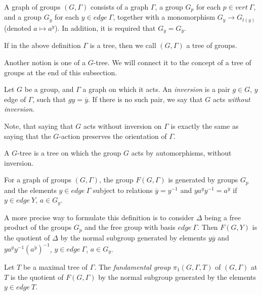 \begin{definition}\label{grpgraph}
    A graph of groups $(G,\Gamma)$ consists of a graph $\Gamma$, a group $G_p$ for each $p \in vert\:\Gamma$, and a group $G_y$ for each $y \in edge \: \Gamma$, together with a monomorphism $G_y \to G_{t(y)}$ (denoted $a \mapsto a^y$). In addition, it is required that $G_y = G_{\overline{y}}$.
\end{definition}

If in the above definition $\Gamma$ is a tree, then we call $(G,\Gamma)$ a tree of groups.

Another notion is one of a $G$-tree. We will connect it to the concept of a tree of groups at the end of this subsection.

\begin{definition}
    Let $G$ be a group, and $\Gamma$ a graph on which it acts. An \emph{inversion} is a pair $g \in G$, $y$ edge of $\Gamma$, such that $gy = \overline{y}$. If there is no such pair, we say that $G$ acts \emph{without inversion}. 
\end{definition}

Note, that saying that $G$ acts without inversion on $\Gamma$ is exactly the same as saying that the $G$-action preserves the orientation of $\Gamma$.

\begin{definition}
    A $G$-tree is a tree on which the group $G$ acts by automorphisms, without inversion.
\end{definition}

\begin{definition}
    For a graph of groups $(G,\Gamma)$, the group $F(G,\Gamma)$ is generated by groups $G_p$ and the elements $y \in edge \: \Gamma$ subject to relations $\overline{y} = y^{-1}$ and $ya^yy^{-1} = a^{\overline{y}}$ if $y \in edge \: Y$, $a \in G_y$.
\end{definition}

A more precise way to formulate this definition is to consider $\Delta$ being a free product of the groups $G_p$ and the free group with basis $edge \: \Gamma$. Then $F(G,Y)$ is the quotient of $\Delta$ by the normal subgroup generated by elements $y\overline{y}$ and $ya^yy^{-1}(a^{\overline{y}})^{-1}$, $y \in edge\:\Gamma$, $a \in G_y$.

\begin{definition}
    Let $T$ be a maximal tree of $\Gamma$. The \emph{fundamental group} $\pi_1(G,\Gamma,T)$ of $(G,\Gamma)$ at $T$ is the quotient of $F(G,\Gamma)$ by the normal subgroup generated by the elements $y \in edge\:T$.
\end{definition}

